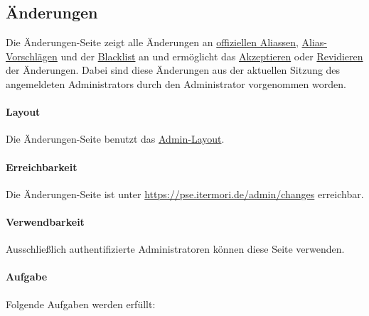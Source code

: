 \newpage
\subsection{Änderungen}

Die Änderungen-Seite zeigt alle Änderungen an \hyperref[AP_Offizielle_Aliasse]{offiziellen Aliassen}, \hyperref[AP_Alias_Vorschlage]{Alias-Vorschlägen} und der \hyperref[AP_Blacklist]{Blacklist} an und ermöglicht das \hyperref[AP_Aktionen_Anderungen_Akzeptieren]{Akzeptieren} oder \hyperref[AP_Aktionen_Anderungen_Revidieren]{Revidieren} der Änderungen.
Dabei sind diese Änderungen aus der aktuellen Sitzung des angemeldeten Administrators durch den Administrator vorgenommen worden.

\paragraph*{Layout}
Die Änderungen-Seite benutzt das \hyperref[AP_Admin_Layout]{Admin-Layout}.

\paragraph*{Erreichbarkeit}
Die Änderungen-Seite ist unter \href{https://pse.itermori.de/admin/changes}{https://pse.itermori.de/admin/changes} erreichbar.

\paragraph*{Verwendbarkeit}
Ausschließlich authentifizierte Administratoren können diese Seite verwenden.

\paragraph*{Aufgabe}
Folgende Aufgaben werden erfüllt:

